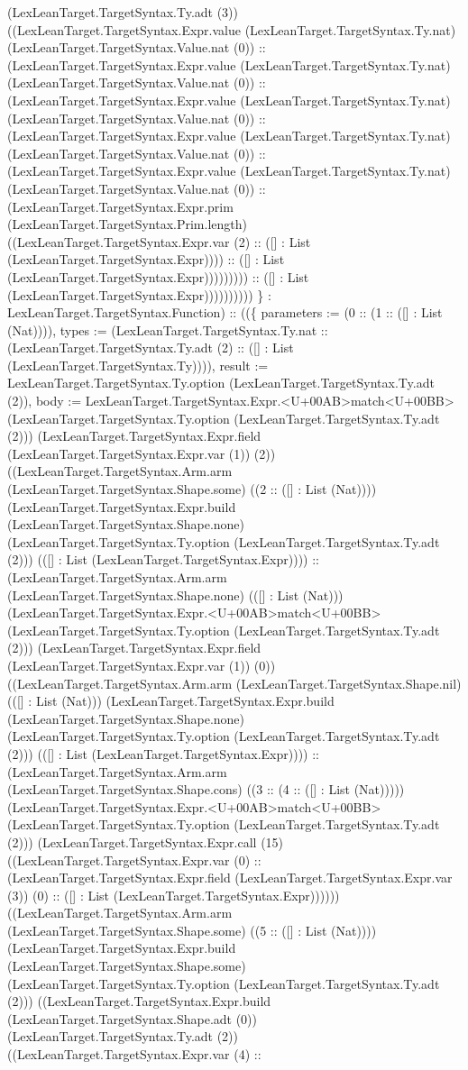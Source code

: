 \documentclass[11pt]{article}
\begin{document}
(LexLeanTarget.TargetSyntax.Ty.adt (3)) ((LexLeanTarget.TargetSyntax.Expr.value (LexLeanTarget.TargetSyntax.Ty.nat) (LexLeanTarget.TargetSyntax.Value.nat (0)) :: (LexLeanTarget.TargetSyntax.Expr.value (LexLeanTarget.TargetSyntax.Ty.nat) (LexLeanTarget.TargetSyntax.Value.nat (0)) :: (LexLeanTarget.TargetSyntax.Expr.value (LexLeanTarget.TargetSyntax.Ty.nat) (LexLeanTarget.TargetSyntax.Value.nat (0)) :: (LexLeanTarget.TargetSyntax.Expr.value (LexLeanTarget.TargetSyntax.Ty.nat) (LexLeanTarget.TargetSyntax.Value.nat (0)) :: (LexLeanTarget.TargetSyntax.Expr.value (LexLeanTarget.TargetSyntax.Ty.nat) (LexLeanTarget.TargetSyntax.Value.nat (0)) :: (LexLeanTarget.TargetSyntax.Expr.prim (LexLeanTarget.TargetSyntax.Prim.length) ((LexLeanTarget.TargetSyntax.Expr.var (2) :: ([] : List (LexLeanTarget.TargetSyntax.Expr)))) :: ([] : List (LexLeanTarget.TargetSyntax.Expr))))))))) :: ([] : List (LexLeanTarget.TargetSyntax.Expr)))))))))) \} : LexLeanTarget.TargetSyntax.Function) :: ((\{ parameters := (0 :: (1 :: ([] : List (Nat)))), types := (LexLeanTarget.TargetSyntax.Ty.nat :: (LexLeanTarget.TargetSyntax.Ty.adt (2) :: ([] : List (LexLeanTarget.TargetSyntax.Ty)))), result := LexLeanTarget.TargetSyntax.Ty.option (LexLeanTarget.TargetSyntax.Ty.adt (2)), body := LexLeanTarget.TargetSyntax.Expr.<U+00AB>match<U+00BB> (LexLeanTarget.TargetSyntax.Ty.option (LexLeanTarget.TargetSyntax.Ty.adt (2))) (LexLeanTarget.TargetSyntax.Expr.field (LexLeanTarget.TargetSyntax.Expr.var (1)) (2)) ((LexLeanTarget.TargetSyntax.Arm.arm (LexLeanTarget.TargetSyntax.Shape.some) ((2 :: ([] : List (Nat)))) (LexLeanTarget.TargetSyntax.Expr.build (LexLeanTarget.TargetSyntax.Shape.none) (LexLeanTarget.TargetSyntax.Ty.option (LexLeanTarget.TargetSyntax.Ty.adt (2))) (([] : List (LexLeanTarget.TargetSyntax.Expr)))) :: (LexLeanTarget.TargetSyntax.Arm.arm (LexLeanTarget.TargetSyntax.Shape.none) (([] : List (Nat))) (LexLeanTarget.TargetSyntax.Expr.<U+00AB>match<U+00BB> (LexLeanTarget.TargetSyntax.Ty.option (LexLeanTarget.TargetSyntax.Ty.adt (2))) (LexLeanTarget.TargetSyntax.Expr.field (LexLeanTarget.TargetSyntax.Expr.var (1)) (0)) ((LexLeanTarget.TargetSyntax.Arm.arm (LexLeanTarget.TargetSyntax.Shape.nil) (([] : List (Nat))) (LexLeanTarget.TargetSyntax.Expr.build (LexLeanTarget.TargetSyntax.Shape.none) (LexLeanTarget.TargetSyntax.Ty.option (LexLeanTarget.TargetSyntax.Ty.adt (2))) (([] : List (LexLeanTarget.TargetSyntax.Expr)))) :: (LexLeanTarget.TargetSyntax.Arm.arm (LexLeanTarget.TargetSyntax.Shape.cons) ((3 :: (4 :: ([] : List (Nat))))) (LexLeanTarget.TargetSyntax.Expr.<U+00AB>match<U+00BB> (LexLeanTarget.TargetSyntax.Ty.option (LexLeanTarget.TargetSyntax.Ty.adt (2))) (LexLeanTarget.TargetSyntax.Expr.call (15) ((LexLeanTarget.TargetSyntax.Expr.var (0) :: (LexLeanTarget.TargetSyntax.Expr.field (LexLeanTarget.TargetSyntax.Expr.var (3)) (0) :: ([] : List (LexLeanTarget.TargetSyntax.Expr)))))) ((LexLeanTarget.TargetSyntax.Arm.arm (LexLeanTarget.TargetSyntax.Shape.some) ((5 :: ([] : List (Nat)))) (LexLeanTarget.TargetSyntax.Expr.build (LexLeanTarget.TargetSyntax.Shape.some) (LexLeanTarget.TargetSyntax.Ty.option (LexLeanTarget.TargetSyntax.Ty.adt (2))) ((LexLeanTarget.TargetSyntax.Expr.build (LexLeanTarget.TargetSyntax.Shape.adt (0)) (LexLeanTarget.TargetSyntax.Ty.adt (2)) ((LexLeanTarget.TargetSyntax.Expr.var (4) :: 
\end{document}

